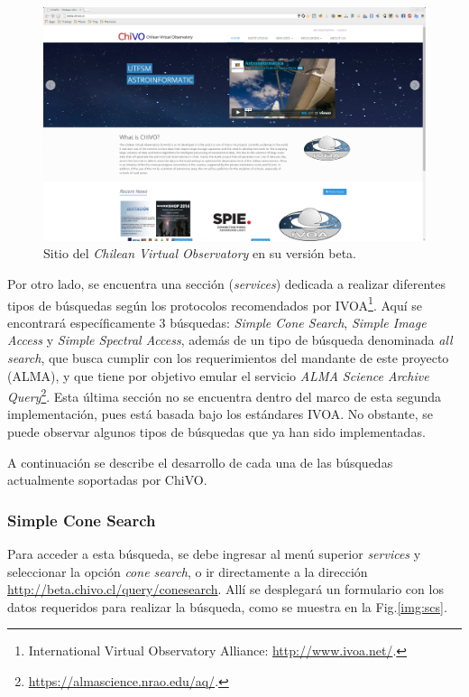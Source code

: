 \begin{figure}[ht!]
    \begin{center}
	\includegraphics[scale=.2]{img/chivo}
    \end{center}
    \caption{Sitio del \emph{Chilean Virtual Observatory} en su
      versión beta.}\label{img:chivo}
\end{figure}

Por otro lado, se encuentra una sección (\emph{services}) dedicada a
realizar diferentes tipos de búsquedas según los protocolos
recomendados por IVOA\footnote{International Virtual Observatory
Alliance: \url{http://www.ivoa.net/}.}. Aquí se encontrará
específicamente 3 búsquedas: \emph{Simple Cone Search}, \emph{Simple
Image Access} y \emph{Simple Spectral Access}, además de un tipo de
búsqueda denominada \emph{all search}, que busca cumplir con los
requerimientos del mandante de este proyecto (ALMA), y que tiene por
objetivo emular el servicio \emph{ALMA Science Archive
Query}\footnote{\url{https://almascience.nrao.edu/aq/}.}. Esta última
sección no se encuentra dentro del marco de esta segunda
implementación, pues está basada bajo los estándares IVOA. No
obstante, se puede observar algunos tipos de búsquedas que ya han sido
implementadas.

A continuación se describe el desarrollo de cada una de las búsquedas
actualmente soportadas por ChiVO.


\subsubsection{Simple Cone Search}

Para acceder a esta búsqueda, se debe ingresar al menú superior
\emph{services} y seleccionar la opción \emph{cone search}, o ir
directamente a la dirección
\url{http://beta.chivo.cl/query/conesearch}. Allí se desplegará un
formulario con los datos requeridos para realizar la búsqueda, como se
muestra en la Fig.\ref{img:scs}.

